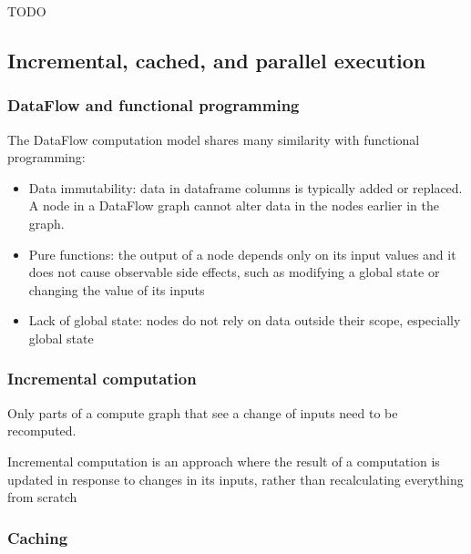 \documentclass[11pt, reqno]{amsart}
\theoremstyle{definition}
\theoremstyle{remark}
\begin{document}
  TODO

  \subsection{Incremental, cached, and parallel execution}

  \subsubsection{DataFlow and functional programming}

  The DataFlow computation model shares many similarity with functional
  programming:

  \begin{itemize}
    \item Data immutability: data in dataframe columns is typically added or
      replaced. A node in a DataFlow graph cannot alter data in the nodes earlier
      in the graph.

    \item Pure functions: the output of a node depends only on its input values
      and it does not cause observable side effects, such as modifying a global state
      or changing the value of its inputs

    \item Lack of global state: nodes do not rely on data outside their scope, especially
      global state
  \end{itemize}

  \subsubsection{Incremental computation}

  Only parts of a compute graph that see a change of inputs need to be
  recomputed.

  Incremental computation is an approach where the result of a computation is
  updated in response to changes in its inputs, rather than recalculating everything
  from scratch

  \subsubsection{Caching}
\end{document}
